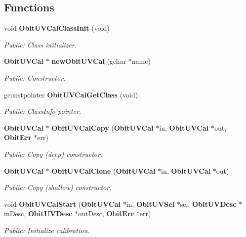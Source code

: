 \subsection*{Functions}
\begin{CompactItemize}
\item 
void {\bf Obit\-UVCal\-Class\-Init} (void)
\begin{CompactList}\small\item\em Public: Class initializer. \item\end{CompactList}\item 
{\bf Obit\-UVCal} $\ast$ {\bf new\-Obit\-UVCal} (gchar $\ast$name)
\begin{CompactList}\small\item\em Public: Constructor. \item\end{CompactList}\item 
gconstpointer {\bf Obit\-UVCal\-Get\-Class} (void)
\begin{CompactList}\small\item\em Public: Class\-Info pointer. \item\end{CompactList}\item 
{\bf Obit\-UVCal} $\ast$ {\bf Obit\-UVCal\-Copy} ({\bf Obit\-UVCal} $\ast$in, {\bf Obit\-UVCal} $\ast$out, {\bf Obit\-Err} $\ast$err)
\begin{CompactList}\small\item\em Public: Copy (deep) constructor. \item\end{CompactList}\item 
{\bf Obit\-UVCal} $\ast$ {\bf Obit\-UVCal\-Clone} ({\bf Obit\-UVCal} $\ast$in, {\bf Obit\-UVCal} $\ast$out)
\begin{CompactList}\small\item\em Public: Copy (shallow) constructor. \item\end{CompactList}\item 
void {\bf Obit\-UVCal\-Start} ({\bf Obit\-UVCal} $\ast$in, {\bf Obit\-UVSel} $\ast$sel, {\bf Obit\-UVDesc} $\ast$in\-Desc, {\bf Obit\-UVDesc} $\ast$out\-Desc, {\bf Obit\-Err} $\ast$err)
\begin{CompactList}\small\item\em Public: Initialize calibration. \item\end{CompactList}\item 

\end{CompactItemize}
